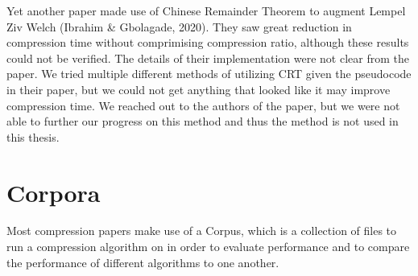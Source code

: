 \documentclass[12pt,twoside]{reedthesis}
\begin{document}
Yet another paper made use of Chinese Remainder Theorem to augment Lempel Ziv Welch (Ibrahim \& Gbolagade, 2020). They saw great reduction in compression time without comprimising compression ratio, although these results could not be verified. The details of their implementation were not clear from the paper. We tried multiple different methods of utilizing CRT given the pseudocode in their paper, but we could not get anything that looked like it may improve compression time. We reached out to the authors of the paper, but we were not able to further our progress on this method and thus the method is not used in this thesis.

\hypertarget{corpora}{%
\section{Corpora}\label{corpora}}

Most compression papers make use of a Corpus, which is a collection of files to run a compression algorithm on in order to evaluate performance and to compare the performance of different algorithms to one another.
\end{document}
